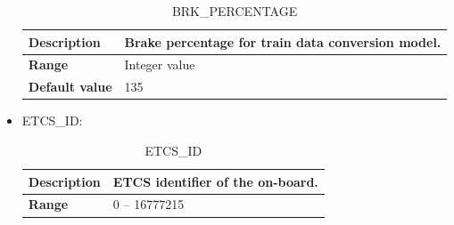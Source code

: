 \begin{itemize}
			\begin{longtable}{|l|l|}
				\caption{BRK\_PERCENTAGE}\\
				\hline

					\begin{minipage}[t]{0.22\linewidth} \textbf{Description}	\end{minipage}
				&	\begin{minipage}[t]{0.78\linewidth} Brake percentage for train data conversion model. \end{minipage} \\

				\hline

					\begin{minipage}[t]{0.22\linewidth} \textbf{Range}	\end{minipage}
				&	\begin{minipage}[t]{0.78\linewidth} Integer value \end{minipage} \\

				\hline

					\begin{minipage}[t]{0.22\linewidth} \textbf{Default value}	\end{minipage}
				&	\begin{minipage}[t]{0.78\linewidth} 135 \end{minipage} \\

				\hline

			\end{longtable}

		\item ETCS\_ID:

			\begin{longtable}{|l|l|}
				\caption{ETCS\_ID}\\
				\hline

					\begin{minipage}[t]{0.22\linewidth} \textbf{Description}	\end{minipage}
				&	\begin{minipage}[t]{0.78\linewidth} ETCS identifier of the on-board. \end{minipage} \\

				\hline

					\begin{minipage}[t]{0.22\linewidth} \textbf{Range}	\end{minipage}
				&	\begin{minipage}[t]{0.78\linewidth} 0 – 16777215 \end{minipage} \\


\end{longtable}
\end{itemize}
